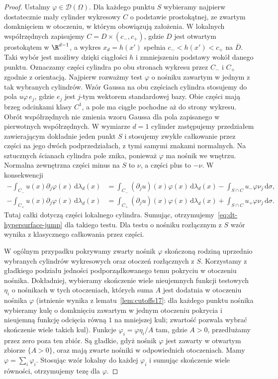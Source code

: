 \begin{proof}
Ustalmy $\varphi\in\mathcal D(\Omega)$.
Dla każdego punktu $S$ wybieramy najpierw
dostatecznie mały cylinder wykresowy $C$
o podstawie prostokątnej, ze zwartym domknięciem
w otoczeniu, w którym obowiązują założenia.
W lokalnych współrzędnych zapisujemy
$C=D\times(c_-,c_+)$, gdzie $D$ jest otwartym
prostokątem w $\R^{d-1}$, a wykres $x_d=h(x')$
spełnia $c_-<h(x')<c_+$ na $\overline D$.
Taki wybór jest możliwy dzięki ciągłości $h$
i zmniejszeniu podstawy wokół danego punktu.
Oznaczamy części cylindra po obu stronach
wykresu przez $C_-$ i $C_+$ zgodnie z orientacją.
Najpierw rozważmy test $\varphi$ o nośniku
zawartym w jednym z tak wybranych cylindrów.
Wzór Gaussa na obu częściach cylindra stosujemy
do pola $u\varphi\,e_j$, gdzie $e_j$ jest $j$-tym
wektorem standardowej bazy. Obie części mają
brzeg odcinkami klasy $C^1$, a pole ma ciągłe
pochodne aż do strony wykresu.
Obrót współrzędnych nie zmienia wzoru Gaussa
dla pola zapisanego w pierwotnych współrzędnych.
W wymiarze $d=1$ cylinder zastępujemy przedziałem
zawierającym dokładnie jeden punkt $S$ i stosujemy
zwykłe całkowanie przez części na jego dwóch
podprzedziałach, z tymi samymi znakami normalnych.
Na sztucznych ścianach cylindra pole znika,
ponieważ $\varphi$ ma nośnik we wnętrzu.
Normalna zewnętrzna części minus na $S$ to $\nu$,
a części plus to $-\nu$. W konsekwencji
\[
 \begin{aligned}
 -\int_{C_-}u(x)\partial_j\varphi(x)\,\mathrm d\lambda_d(x)
 &=\int_{C_-}(\partial_ju)(x)\varphi(x)\,\mathrm d\lambda_d(x)
   -\int_{S\cap C} u_-\varphi\nu_j\,\mathrm d\sigma,\\
 -\int_{C_+}u(x)\partial_j\varphi(x)\,\mathrm d\lambda_d(x)
 &=\int_{C_+}(\partial_ju)(x)\varphi(x)\,\mathrm d\lambda_d(x)
   +\int_{S\cap C} u_+\varphi\nu_j\,\mathrm d\sigma.
 \end{aligned}
\]
Tutaj całki dotyczą części lokalnego cylindra.
Sumując, otrzymujemy~\eqref{eq:dt-hypersurface-jump} dla takiego
testu. Dla testu o nośniku rozłącznym z $S$ wzór
wynika z klasycznego całkowania przez części.

W ogólnym przypadku pokrywamy zwarty nośnik
$\varphi$ skończoną rodziną uprzednio wybranych
cylindrów wykresowych oraz otoczeń rozłącznych
z $S$. Korzystamy z gładkiego
podziału jedności podporządkowanego temu pokryciu
w otoczeniu nośnika. Dokładniej, wybieramy skończenie
wiele nieujemnych funkcji testowych $\eta_i$
o nośnikach w tych otoczeniach, których suma $A$
jest dodatnia w otoczeniu nośnika $\varphi$
(istnienie wynika z lematu~\ref{lem:cutoffs17}:
dla każdego punktu nośnika wybieramy kulę o domknięciu
zawartym w jednym otoczeniu pokrycia i nieujemną funkcję
odcięcia równą $1$ na mniejszej kuli; zwartość pozwala
wybrać skończenie wiele takich kul).
Funkcje $\varphi_i=\varphi\eta_i/A$ tam, gdzie $A>0$,
przedłużamy przez zero poza ten zbiór.
Są gładkie, gdyż nośnik $\varphi$ jest zawarty
w otwartym zbiorze $\{A>0\}$, oraz mają zwarte
nośniki w odpowiednich otoczeniach.
Mamy $\varphi=\sum_i\varphi_i$. Stosując wzór
lokalny do każdej $\varphi_i$ i sumując skończenie
wiele równości, otrzymujemy tezę dla $\varphi$.
\end{proof}


